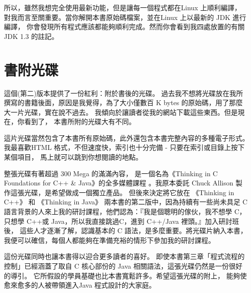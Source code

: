 所以，雖然我想完全使用最新功能，但是讓每一個程式都在Linux 上順利編譯，
對我而言至關重要。當你解開本書原始碼檔案，並在Linux 上以最新的 JDK 進行編譯，
你會發現所有程式應該都能夠順利完成。然而你會看到我四處放置的有關 JDK 1.3
的註記。

\section{書附光碟}
這個(第二)版本提供了一份紅利：附於書後的光碟。
過去我不想將光碟放在我所撰寫的書籍後面，原因是我覺得，為了大小僅數百
K bytes 的原始碼，用了那麼大一片光碟，實在說不過去。
我傾向於讓讀者從我的網站下載這些東西。但是現在，你看到了，
本書所附的光碟大有不同。

這片光碟當然包含了本書所有原始碼，此外還包含本書完整內容的多種電子形式。
我最喜歡HTML 格式，不但速度快，索引也十分完備 - 只要在索引或目錄上按下某個項目，
馬上就可以跳到你想閱讀的地點。

整張光碟有著超過 300 Mega 的滿滿內容，
是一個名為《Thinking in C Foundations for C++ \& Java》的全多媒體課程
。我原本委託 Chuck Allison 製作這張光碟，是希望做成一個獨立產品。
但後來決定將它放在 《Thinking in C++》 和
《Thinking in Java》 兩本書的第二版中，因為持續有一些尚未具足
C 語言背景的人來上我的研討課程，他們認為：『我是個聰明的傢伙，我不想學
C，只想學 C++或 Java，所以我直接跳過C，進到 C++/Java 裡頭。』加入研討班後，
這些人才逐漸了解，認識基本的 C 語法，是多麼重要。將光碟片納入本書，
我便可以確信，每個人都能夠在準備充裕的情形下參加我的研討課程。

這份光碟同時也讓本書得以迎合更多讀者的喜好。
即使本書第三章「程式流程的控制」已經涵蓋了取自 C 核心部份的
Java 相關語法，這張光碟仍然是一份很好的導引。
它所假設的學員基礎也比本書寬鬆許多。希望這張光碟的附上，
能夠使愈來愈多的人被帶領進入Java 程式設計的大家庭。

